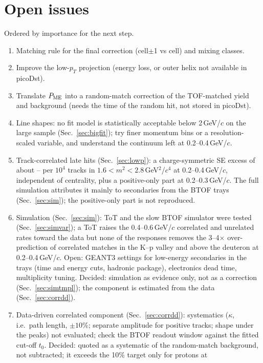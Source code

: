 \section{Open issues}
\label{sec:open}
Ordered by importance for the next step.
\begin{enumerate}
\item [decision] Matching rule for the final correction (cell$\pm$1 vs cell) and mixing classes.
\item Improve the low-$p_T$ projection (energy loss, or outer helix not available in picoDst).
\item Translate $P_{\rm ME}$ into a random-match correction of the TOF-matched yield and \mtwo{} background
  (needs the time of the random hit, not stored in picoDst).
\item Line shapes: no fit model is statistically acceptable below 2\,GeV/$c$ on the large sample (Sec.~\ref{sec:bigfit}); try finer
  momentum bins or a resolution-scaled variable, and understand the continuum left at 0.2--0.4\,GeV/$c$.
\item Track-correlated late hits (Sec.~\ref{sec:lowp}): a charge-symmetric SE excess of about \lowpTwoADmin--\lowpTwoADmax{} per
  $10^4$ tracks in $1.6<m^2<2.8$\,GeV$^2$/$c^4$ at 0.2--0.4\,GeV/$c$, independent of centrality, plus a positive-only part at
  0.2--0.3\,GeV/$c$. The full simulation attributes it mainly to secondaries from the BTOF trays (Sec.~\ref{sec:sim}); the
  positive-only part is not reproduced.
\item Simulation (Sec.~\ref{sec:sim}): ToT and the slow BTOF simulator were tested (Sec.~\ref{sec:simvar}); a ToT raises the
  0.4--0.6\,GeV/$c$ correlated and unrelated rates toward the data but none of the responses removes the 3--4$\times$ over-prediction of
  correlated matches in the K--p valley and above the deuteron at 0.2--0.4\,GeV/$c$. Open: GEANT3 settings for low-energy secondaries
  in the trays (time and energy cuts, hadronic package), electronics dead time, multiplicity tuning. Decided: simulation as evidence
  only, not as a correction (Sec.~\ref{sec:simtmpl}); the component is estimated from the data (Sec.~\ref{sec:corrdd}).
\item Data-driven correlated component (Sec.~\ref{sec:corrdd}): systematics ($\kappa$, i.e.\ path length, $\pm10\%$; separate amplitude
  for positive tracks; shape under the peaks) not evaluated; check the BTOF readout window against the fitted cut-off $t_0$.
  Decided: quoted as a systematic of the random-match background, not subtracted; it exceeds the 10\% target only for protons at

\end{enumerate}
